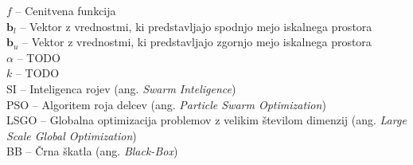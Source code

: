 $f$ -- Cenitvena funkcija \\
$\mathbf{b}_{l}$ -- Vektor z vrednostmi, ki predstavljajo spodnjo mejo iskalnega prostora \\
$\mathbf{b}_{u}$ -- Vektor z vrednostmi, ki predstavljajo zgornjo mejo iskalnega prostora \\
$\alpha$ -- TODO \\
$k$ -- TODO \\
SI -- Inteligenca rojev (ang. \textit{Swarm Inteligence}) \\
PSO -- Algoritem roja delcev (ang. \textit{Particle Swarm Optimization}) \\
LSGO -- Globalna optimizacija problemov z velikim številom dimenzij (ang. \textit{Large Scale Global Optimization}) \\
BB -- Črna škatla (ang. \textit{Black-Box}) \\